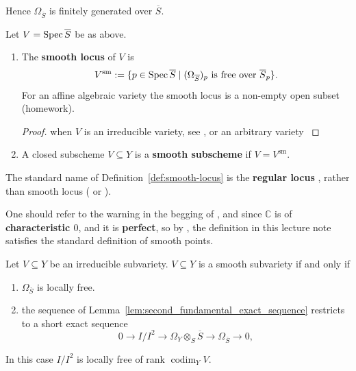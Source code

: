 Hence $\Omega_{\overline S}$ is finitely generated over $\overline S$.

\begin{definition}\label{def:smooth-locus}
    Let $V=\operatorname{Spec} \overline S$ be as above.
    \begin{enumerate}
        \item The \textbf{smooth locus} of $V$ is
              \[
                  V^{\mathrm{sm}}
                  :=\{p\in \operatorname{Spec} \overline S\mid
                  (\Omega_{\overline S})_p
                  \text{ is free over }\overline S_p\}.
              \]
              For an affine algebraic variety the smooth locus is a non-empty open
              subset (homework).
              \begin{proof}
                  when $V$ is an irreducible variety, see \cite[Corollary 8.16.]{hartshorne1977algebraic}, or an arbitrary variety \cite[Chap.~4, Lem.~2.21. and Prop.~2.24.]{liu2002algebraic}
              \end{proof}
        \item A closed subscheme $V\subseteq Y$ is a \textbf{smooth subscheme} if
              $V=V^{\mathrm{sm}}$.
    \end{enumerate}
\end{definition}

\begin{remark}[\textcolor{red}{Warning}]\label{rmk:smooth-locus}
    The standard name of Definition~\ref{def:smooth-locus} is the \textbf{regular locus} \cite[Section~4.2.2, Definition~2.8.]{liu2002algebraic}, rather than smooth locus (\cite[\href{https://stacks.math.columbia.edu/tag/01V5}{Tag 01V5}]{stacks-project} or \cite[Section~4.3.3, Definition~3.28, Exercise~3.20.]{liu2002algebraic}).

    One should refer to the warning in the begging of \cite[\href{https://stacks.math.columbia.edu/tag/00TQ}{Tag 00TQ}]{stacks-project}, and since $\mathbb{C}$ is of \textbf{characteristic $0$}, and it is \textbf{perfect}, so by \cite[\href{https://stacks.math.columbia.edu/tag/00TX}{Tag 00TX}]{stacks-project}, the definition in this lecture note satisfies the standard definition of smooth points.

\end{remark}

\begin{proposition}\label{prop:smooth-subvariety}
    Let $V\subseteq Y$ be an irreducible subvariety.  $V\subseteq Y$ is a smooth subvariety if and only if
    \begin{enumerate}
        \item $\Omega_{\overline S}$ is locally free.
        \item the sequence of Lemma~\ref{lem:second_fundamental_exact_sequence}
              restricts to a short exact sequence
              \[
                  0\longrightarrow I/I^2
                  \longrightarrow \Omega_Y\otimes_S \overline S
                  \longrightarrow \Omega_{\overline S}
                  \longrightarrow 0,
              \]
    \end{enumerate}
    In this case $I/I^2$ is locally free of rank $\operatorname{codim}_Y V$.
\end{proposition}

